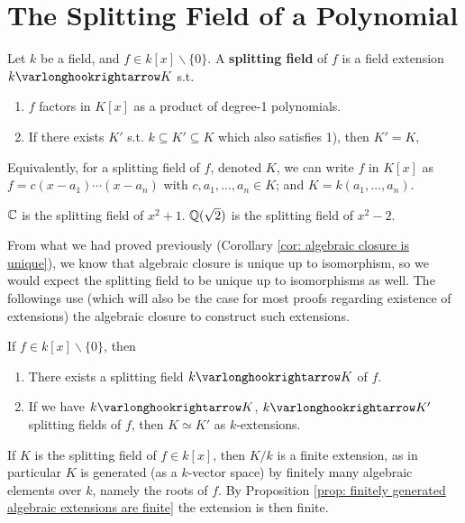 \documentclass{article}
\begin{document}
\section{The Splitting Field of a Polynomial}

\begin{definition}
    Let $k$ be a field, and $f \in k[x] \smallsetminus \{0\}$. A \textbf{splitting field} of $f$ is a field extension $k \ext K$ s.t. 
    \begin{enumerate}[label=\arabic*)]
        \item $f$ factors in $K[x]$ as a product of degree-1 polynomials.
        \item If there exists $K'$ s.t. $k \subseteq K' \subseteq K$ which also satisfies 1), then $K' = K$,
    \end{enumerate}
    Equivalently, for a splitting field of $f$, denoted $K$, we can write $f$ in $K[x]$ as $f = c(x - a_1) \cdots (x - a_n)$ with $c, a_1, \dots, a_n \in K$; and $K = k(a_1, \dots, a_n)$. 
\end{definition}

\begin{example}
    $\mathbb{C}$ is the splitting field of $x^2 + 1$. $\mathbb{Q}(\sqrt{2})$ is the splitting field of $x^2 - 2$.
\end{example}

\textstart
From what we had proved previously (Corollary \ref{cor: algebraic closure is unique}), we know that algebraic closure is unique up to isomorphism, so we would expect the splitting field to be unique up to isomorphisms as well. The followings use (which will also be the case for most proofs regarding existence of extensions) the algebraic closure to construct such extensions.

\begin{theorem}\label{thm: splitting field is unique}
    If $f \in k[x] \smallsetminus \{0\}$, then
    \begin{enumerate}
        \item There exists a splitting field $k \ext K$ of $f$.
        \item If we have $k \ext K$, $k \ext K'$ splitting fields of $f$, then $K \simeq K'$ as $k$-extensions.
    \end{enumerate}
\end{theorem}

\begin{remark}
    If $K$ is the splitting field of $f \in k[x]$, then $K/k$ is a finite extension, as in particular $K$ is generated (as a $k$-vector space) by finitely many algebraic elements over $k$, namely the roots of $f$. By Proposition \ref{prop: finitely generated algebraic extensions are finite} the extension is then finite.
\end{remark}
\end{document}
